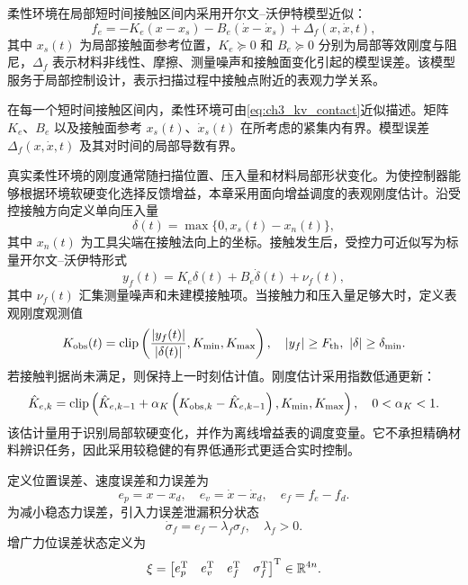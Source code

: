 柔性环境在局部短时间接触区间内采用开尔文--沃伊特模型近似：
\begin{equation}
  f_e=-K_e(x-x_s)-B_e(\dot x-\dot x_s)+\Delta_f(x,\dot x,t),
  \label{eq:ch3_kv_contact}
\end{equation}
其中 $x_s(t)$ 为局部接触面参考位置，$K_e\succeq0$ 和 $B_e\succeq0$ 分别为局部等效刚度与阻尼，$\Delta_f$ 表示材料非线性、摩擦、测量噪声和接触面变化引起的模型误差。该模型服务于局部控制设计，表示扫描过程中接触点附近的表观力学关系。

\begin{assumption}[柔性接触模型局部有效性]
\label{ass:ch3_contact_model}
在每一个短时间接触区间内，柔性环境可由\eqref{eq:ch3_kv_contact}近似描述。矩阵 $K_e$、$B_e$ 以及接触面参考 $x_s(t)$、$\dot x_s(t)$ 在所考虑的紧集内有界。模型误差 $\Delta_f(x,\dot x,t)$ 及其对时间的局部导数有界。
\end{assumption}

真实柔性环境的刚度通常随扫描位置、压入量和材料局部形状变化。为使控制器能够根据环境软硬变化选择反馈增益，本章采用面向增益调度的表观刚度估计。沿受控接触方向定义单向压入量
\begin{equation}
  \delta(t)=\max\{0,x_s(t)-x_n(t)\},
  \label{eq:ch3_delta_contact}
\end{equation}
其中 $x_n(t)$ 为工具尖端在接触法向上的坐标。接触发生后，受控力可近似写为标量开尔文--沃伊特形式
\begin{equation}
  y_f(t)=K_e\delta(t)+B_e\dot\delta(t)+\nu_f(t),
  \label{eq:ch3_scalar_kv}
\end{equation}
其中 $\nu_f(t)$ 汇集测量噪声和未建模接触项。当接触力和压入量足够大时，定义表观刚度观测值
\begin{equation}
  K_{\mathrm{obs}}(t)=
  \operatorname{clip}\left(\frac{|y_f(t)|}{|\delta(t)|},K_{\min},K_{\max}\right),
  \quad |y_f|\ge F_{\mathrm{th}},\ |\delta|\ge\delta_{\min}.
  \label{eq:ch3_K_obs}
\end{equation}
若接触判据尚未满足，则保持上一时刻估计值。刚度估计采用指数低通更新：
\begin{equation}
  \hat K_{e,k}=
  \operatorname{clip}\left(\hat K_{e,k-1}+\alpha_K\left(K_{\mathrm{obs},k}-\hat K_{e,k-1}\right),
  K_{\min},K_{\max}\right),
  \quad 0<\alpha_K<1 .
  \label{eq:ch3_K_ema}
\end{equation}
该估计量用于识别局部软硬变化，并作为离线增益表的调度变量。它不承担精确材料辨识任务，因此采用较稳健的有界低通形式更适合实时控制。

定义位置误差、速度误差和力误差为
\begin{equation}
  e_p=x-x_d,
  \quad e_v=\dot x-\dot x_d,
  \quad e_f=f_e-f_d .
  \label{eq:ch3_errors}
\end{equation}
为减小稳态力误差，引入力误差泄漏积分状态
\begin{equation}
  \dot\sigma_f=e_f-\lambda_f\sigma_f,
  \quad \lambda_f>0 .
  \label{eq:ch3_sigma}
\end{equation}
增广力位误差状态定义为
\begin{equation}
  \xi=\begin{bmatrix}e_p^{\mathrm{T}}&e_v^{\mathrm{T}}&e_f^{\mathrm{T}}&\sigma_f^{\mathrm{T}}\end{bmatrix}^{\mathrm{T}}\in\mathbb{R}^{4n}.
  \label{eq:ch3_xi}
\end{equation}

